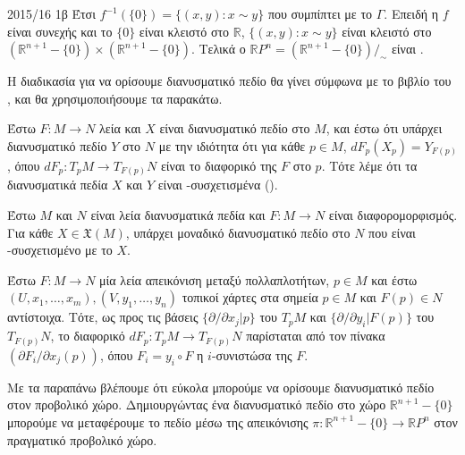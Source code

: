 \documentclass[a4paper,11pt]{article}
\begin{document}
\begin{solution}{2015/16 1β}
    Έτσι \( f^{-1}( \{0\} ) = \{ (x,y): x \sim y \} \) που συμπίπτει με το
     \(\Gamma\). Επειδή η \( f \) είναι
    συνεχής και το \( \{0\} \) είναι κλειστό στο \( \mathbb{R} \),
    \( \{ (x,y): x \sim y \} \) είναι κλειστό στο \( (\mathbb{R}^{n+1} - \{0\})
    \times (\mathbb{R}^{n+1} - \{0\}) \). Τελικά ο \( \mathbb{R}P^n =
    (\mathbb{R}^{n+1} - \{0\})/_{\sim} \) είναι .

    Η διαδικασία για να ορίσουμε διανυσματικό πεδίο θα γίνει σύμφωνα με το βιβλίο
    του  \cite{lee2012introduction},
    και θα χρησιμοποιήσουμε τα παρακάτω.
    \begin{defn}
        Έστω \( F: M \to N \) λεία και \( X \) είναι διανυσματικό πεδίο στο \( M
        \), και έστω ότι υπάρχει διανυσματικό πεδίο \( Y \) στο \( N \) με την
        ιδιότητα ότι για κάθε \( p \in M \), \( dF_p(X_p) = Y_{F(p)} \), όπου
        \( dF_p: T_pM \to T_{F(p)}N \) είναι το διαφορικό της \( F \) στο \( p \).
        Τότε λέμε ότι τα διανυσματικά πεδία \( X \) και \( Y \) είναι
        -συσχετισμένα ().
    \end{defn}
    \begin{prop}
        Έστω \( M \) και \( N \) είναι λεία διανυσματικά πεδία και \( F: M \to N
        \) είναι διαφορομορφισμός. Για κάθε \( X \in \mathfrak{X}(M) \), υπάρχει
        μοναδικό διανυσματικό πεδίο στο \( N \) που είναι -συσχετισμένο με
        το \( X \).
    \end{prop}
    \begin{prop}
        Έστω \( F: M \to N \) μία λεία απεικόνιση μεταξύ πολλαπλοτήτων, \( p \in
        M \) και έστω \( (U, x_1, \dots, x_m), (V, y_1, \dots, y_n) \) τοπικοί
        χάρτες στα σημεία \( p \in M \) και \( F(p) \in N \) αντίστοιχα. Τότε,
        ως προς τις βάσεις \( \{\partial/ \partial x_j |p \} \) του \( T_pM \)
        και \( \{\partial/ \partial y_i |F(p) \} \) του \( T_{F(p)}N \), το
        διαφορικό \( dF_p: T_pM \to T_{F(p)}N \) παρίσταται από τον πίνακα \(
        \left( \partial F_i/ \partial x_j(p) \right) \), όπου \( F_i = y_i \circ
        F \) η \(i\)-συνιστώσα της \( F \).
    \end{prop}
    Με τα παραπάνω βλέπουμε ότι εύκολα μπορούμε να ορίσουμε διανυσματικό πεδίο
    στον προβολικό χώρο. Δημιουργώντας ένα διανυσματικό πεδίο στο χώρο
    \( \mathbb{R}^{n+1} - \{0\} \) μπορούμε να μεταφέρουμε το πεδίο μέσω της
    απεικόνισης \( \pi: \mathbb{R}^{n+1} - \{0\} \to \mathbb{R}P^n \) στον
    πραγματικό προβολικό χώρο.
\end{solution}
\end{document}
